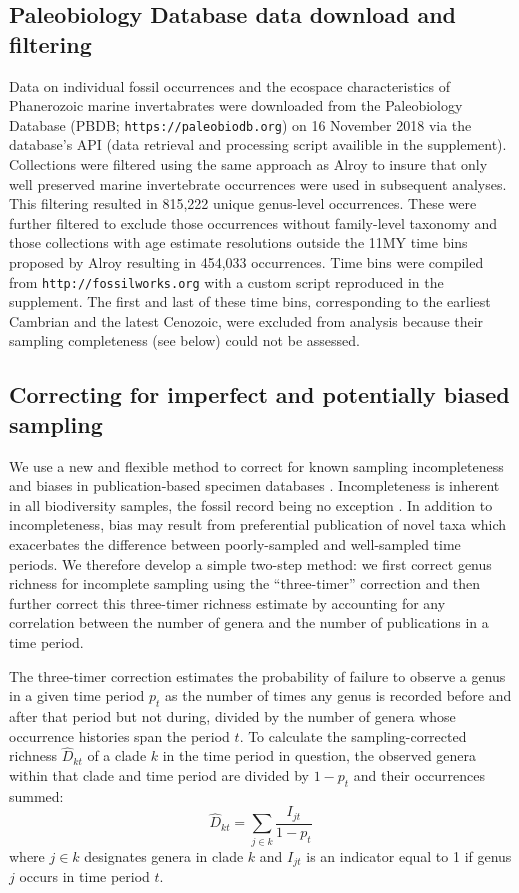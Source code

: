 \documentclass[12pt]{article}
\let\citep=\cite
\begin{document}
\subsection{Paleobiology Database data download and filtering}
Data on individual fossil occurrences and the ecospace characteristics
of Phanerozoic marine invertabrates were downloaded from the
Paleobiology Database (PBDB; \newline\texttt{https://paleobiodb.org}) on 16
November 2018 via the database's API (data retrieval and processing
script availible in the supplement). Collections were filtered using
the same approach as Alroy \citep{alroy08} to insure that only well
preserved marine invertebrate occurrences were used in subsequent
analyses. This filtering resulted in 815,222 unique genus-level
occurrences. These were further filtered to exclude those occurrences
without family-level taxonomy and those collections with age estimate
resolutions outside the 11MY time bins proposed by Alroy
\citep{alroy08} resulting in 454,033 occurrences. Time bins were
compiled from {\tt http://fossilworks.org} with a custom script
reproduced in the supplement. The first and last of these time bins,
corresponding to the earliest Cambrian and the latest Cenozoic, were
excluded from analysis because their sampling completeness (see below)
could not be assessed.


\subsection{Correcting for imperfect and potentially biased sampling}
\label{sec:3TP}
We use a new and flexible method to correct for known sampling
incompleteness and biases in publication-based specimen databases
\citep{alroy08, alroy2010}. Incompleteness is inherent in all
biodiversity samples, the fossil record being no exception
\citep{miller1996, foote2016, starrfelt2016, close2018}.  In addition
to incompleteness, bias may result from preferential publication of
novel taxa \citep{alroy2010} which exacerbates the difference between
poorly-sampled and well-sampled time periods. We therefore develop a
simple two-step method: we first correct genus richness for incomplete
sampling using the ``three-timer'' correction \citep{alroy08} and then
further correct this three-timer richness estimate by accounting for
any correlation between the number of genera and the number of
publications in a time period.

The three-timer correction estimates the probability of failure to
observe a genus in a given time period $p_t$ as the number of times
any genus is recorded before and after that period but not during,
divided by the number of genera whose occurrence histories span the
period $t$.  To calculate the sampling-corrected richness
$\hat{D}_{kt}$ of a clade $k$ in the time period in question, the
observed genera within that clade and time period are divided by
$1 - p_t$ and their occurrences summed:
\begin{equation}
  \hat{D}_{kt} = \sum_{j \in k} \frac{I_{jt}}{1 - p_t}
\end{equation}
where $j \in k$ designates genera in clade $k$ and $I_{jt}$ is an
indicator equal to 1 if genus $j$ occurs in time period $t$.
\end{document}
